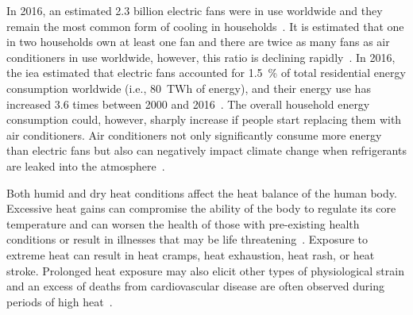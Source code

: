 In 2016, an estimated 2.3 billion electric fans were in use worldwide and they remain the most common form of cooling in households~\cite{IEA2018}.
It is estimated that one in two households own at least one fan and there are twice as many fans as air conditioners in use worldwide, however, this ratio is declining rapidly~\cite{IEA2018}.
In 2016, the \ac{iea} estimated that electric fans accounted for 1.5~\% of total residential energy consumption worldwide (i.e., 80~TWh of energy), and their energy use has increased 3.6 times between 2000 and 2016~\cite{IEA2018}.
The overall household energy consumption could, however, sharply increase if people start replacing them with air conditioners.
Air conditioners not only significantly consume more energy than electric fans but also can negatively impact climate change when refrigerants are leaked into the atmosphere~\cite{IEA2018}.

Both humid and dry heat conditions affect the heat balance of the human body.
Excessive heat gains can compromise the ability of the body to regulate its core temperature and can worsen the health of those with pre-existing health conditions or result in illnesses that may be life threatening~\cite{WMO2015}.
Exposure to extreme heat can result in heat cramps, heat exhaustion, heat rash, or heat stroke.
Prolonged heat exposure may also elicit other types of physiological strain and an excess of deaths from cardiovascular disease are often observed during periods of high heat~\cite{Semenza1996}.

